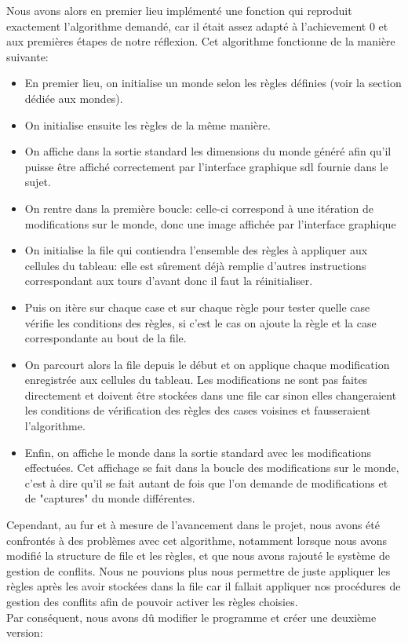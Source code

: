 \documentclass[11pt, a4paper]{article}
\begin{document}
Nous avons alors en premier lieu implémenté une fonction qui reproduit exactement l'algorithme demandé, car il était assez adapté à l'achievement 0 et aux premières étapes de notre réflexion. 
Cet algorithme fonctionne de la manière suivante: 
\begin{itemize}
    \item En premier lieu, on initialise un monde selon les règles définies (voir la section dédiée aux mondes).
    \item On initialise ensuite les règles de la même manière.
    \item On affiche dans la sortie standard les dimensions du monde généré afin qu'il puisse être affiché correctement par l'interface graphique sdl fournie dans le sujet.
    \item On rentre dans la première boucle: celle-ci correspond à une itération de modifications sur le monde, donc une image affichée par l'interface graphique
    \item On initialise la file qui contiendra l'ensemble des règles à appliquer aux cellules du tableau: elle est sûrement déjà remplie d'autres instructions correspondant aux tours d'avant donc il faut la réinitialiser.
    \item Puis on itère sur chaque case et sur chaque règle pour tester quelle case vérifie les conditions des règles, si c'est le cas on ajoute la règle et la case correspondante au bout de la file.
    \item On parcourt alors la file depuis le début et on applique chaque modification enregistrée aux cellules du tableau. Les modifications ne sont pas faites directement et doivent être stockées dans une file car sinon elles changeraient les conditions de vérification des règles des cases voisines et fausseraient l'algorithme.
    \item Enfin, on affiche le monde dans la sortie standard avec les modifications effectuées. Cet affichage se fait dans la boucle des modifications sur le monde, c'est à dire qu'il se fait autant de fois que l'on demande de modifications et de "captures" du monde différentes.\\
    
\end{itemize}
Cependant, au fur et à mesure de l'avancement dans le projet, nous avons été confrontés à des problèmes avec cet algorithme, notamment lorsque nous avons modifié la structure de file et les règles, et que nous avons rajouté le système de gestion de conflits. Nous ne pouvions plus nous permettre de juste appliquer les règles après les avoir stockées dans la file car il fallait appliquer nos procédures de gestion des conflits afin de pouvoir activer les règles choisies. \\
Par conséquent, nous avons dû modifier le programme et créer une deuxième version:
\end{document}
